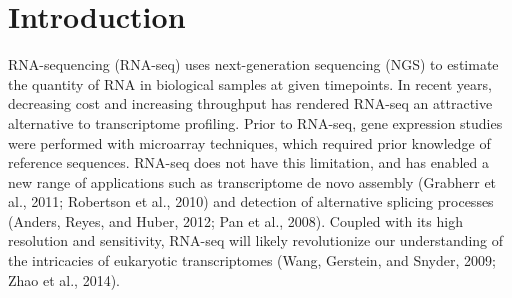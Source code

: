 \documentclass[useAMS,referee]{biom}
\begin{document}
\maketitle


%

\section{Introduction}
\label{s:intro}

RNA-sequencing (RNA-seq) uses next-generation sequencing (NGS) to estimate the quantity of RNA in biological samples at given timepoints. In recent years, decreasing cost and increasing throughput has rendered RNA-seq an attractive alternative to transcriptome profiling. Prior to RNA-seq, gene expression studies were performed with microarray techniques, which required prior knowledge of reference sequences. RNA-seq does not have this limitation, and has enabled a new range of applications such as transcriptome de novo assembly (Grabherr et al., 2011; Robertson et al., 2010) and detection of alternative splicing processes (Anders, Reyes, and Huber, 2012; Pan et al., 2008). Coupled with its high resolution and sensitivity, RNA-seq will likely revolutionize our understanding of the intricacies of eukaryotic transcriptomes (Wang, Gerstein, and Snyder, 2009; Zhao et al., 2014).
\end{document}
